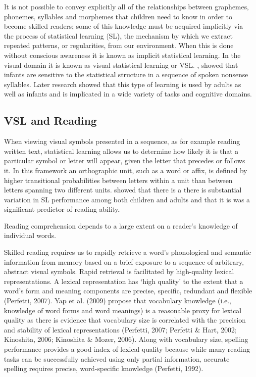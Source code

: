 \documentclass[review]{elsarticle}
\begin{document}
It is not possible to convey explicitly all of the relationships between graphemes, phonemes, syllables and morphemes that children need to know in order to become skilled readers; some of this knowledge must be acquired implicitly via the process of statistical learning (SL), the mechanism by which we extract repeated patterns, or regularities, from our environment.  When this is done without conscious awareness it is known as implicit statistical learning.  In the visual domain it is known as visual statistical learning or VSL.   \citet{saffranWordSegmentationRole1996}, showed that  infants are sensitive to the statistical structure in a sequence of spoken nonsense syllables.  Later research showed that this type of learning is used by adults as well as infants and is implicated in a wide variety of tasks and cognitive domains.

\subsection{ VSL and Reading}

When viewing visual symbols presented in a sequence, as for example reading written text, statistical learning allows us to determine how likely it is that a particular symbol or letter will appear, given the letter that precedes or follows it. In this framework an orthographic unit, such as a word or affix, is defined by higher transitional probabilities between letters within a unit than between letters spanning two different units.	\citet{arciuliStatisticalLearningRelated2012} showed that there is a there is substantial variation in SL performance among both children and adults and that it is was a significant predictor of reading ability.

Reading comprehension depends to a large extent on a reader's knowledge of individual words.	

Skilled reading requires us to rapidly retrieve a word’s phonological and semantic information from memory based on a brief exposure to a sequence of arbitrary, abstract visual symbols. Rapid retrieval is facilitated by high-quality lexical representations. A lexical representation has ‘high quality’ to the extent that a word’s form and meaning components are precise, specific, redundant and flexible (Perfetti, 2007). Yap et al. (2009) propose that vocabulary knowledge (i.e., knowledge of word forms and word meanings) is a reasonable proxy for lexical quality as there is evidence that vocabulary size is correlated with the precision and stability of lexical representations (Perfetti, 2007; Perfetti \& Hart, 2002; Kinoshita, 2006; Kinoshita \& Mozer, 2006).  Along with vocabulary size, spelling performance provides a good index of lexical quality because while many reading tasks can be successfully achieved using only partial information, accurate spelling requires precise, word-specific knowledge (Perfetti, 1992).
\end{document}
